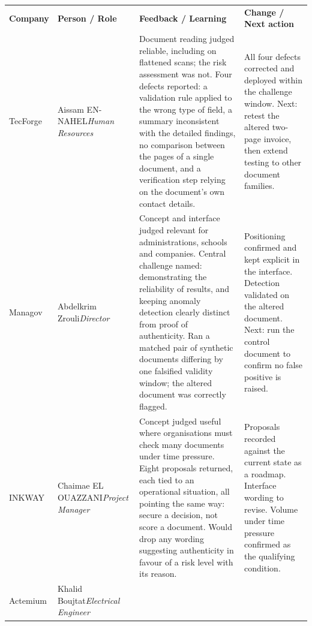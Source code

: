 \documentclass[10pt,a4paper]{article}
\begin{document}
\vspace{3pt}
\begin{tabular}{@{}>{\raggedright\arraybackslash}p{28mm}
                  >{\raggedright\arraybackslash}p{33mm}
                  >{\raggedright\arraybackslash}p{\dimexpr\linewidth-114mm}
                  >{\raggedright\arraybackslash}p{40mm}@{}}
\rowcolor{zebra}\textbf{\color{navy}Company} & \textbf{\color{navy}Person / Role} &
\textbf{\color{navy}Feedback / Learning} & \textbf{\color{navy}Change / Next action} \\[3pt]
\rowcolor{zebra}
TecForge &
Aissam EN-NAHEL\newline \textit{Human Resources} &
Document reading judged reliable, including on flattened scans; the risk
assessment was not. Four defects reported: a validation rule applied to the
wrong type of field, a summary inconsistent with the detailed findings, no
comparison between the pages of a single document, and a verification step
relying on the document's own contact details. &
All four defects corrected and deployed within the challenge window.
Next: retest the altered two-page invoice, then extend testing to other
document families. \\ \hline
Managov &
Abdelkrim Zrouli\newline \textit{Director} &
Concept and interface judged relevant for administrations, schools and
companies. Central challenge named: demonstrating the reliability of results,
and keeping anomaly detection clearly distinct from proof of authenticity. Ran a
matched pair of synthetic documents differing by one falsified validity window;
the altered document was correctly flagged. &
Positioning confirmed and kept explicit in the interface. Detection validated on
the altered document. Next: run the control document to confirm no false
positive is raised. \\ \hline
\rowcolor{zebra}
INKWAY &
Chaimae EL OUAZZANI\newline \textit{Project Manager} &
Concept judged useful where organisations must check many documents under time
pressure. Eight proposals returned, each tied to an operational situation, all
pointing the same way: secure a decision, not score a document. Would drop any
wording suggesting authenticity in favour of a risk level with its reason. &
Proposals recorded against the current state as a roadmap. Interface wording to
revise. Volume under time pressure confirmed as the qualifying condition.
\\ \hline
Actemium &
Khalid Boujtat\newline \textit{Electrical Engineer} &

\end{tabular}
\end{document}
